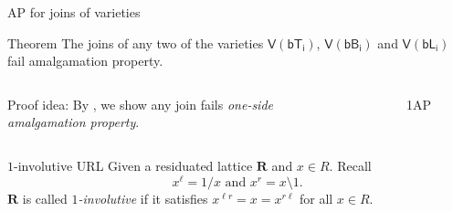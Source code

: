 \documentclass[professionalfont, handout, 12pt]{beamer} %
\theoremstyle{plain}
\theoremstyle{definition}
\newcommand{\m}[1]{{\mathbf {#1} }}
\newcommand{\ld}{{\setminus}}
\begin{document}
\begin{frame}{AP for joins of varieties}
    \begin{block}{Theorem}
    The joins of any two of the varieties $\mathsf{V(bT_i)}$, $\mathsf{V(bB_i)}$ and $\mathsf{V(bL_i)}$ fail amalgamation property.
    \end{block}
    \pause

\begin{columns}
    Proof idea: By \cite{fussner2022transfer}, we show any join fails \emph{one-side amalgamation property}.\pause

    \begin{figure}
        \centering
        \caption{1AP}
    \end{figure}
\end{columns}
    
\end{frame}

\begin{frame}{$1$-involutive URL}
    Given a residuated lattice $\m R$ and $x \in R$.
    Recall
    \[
        x^\ell = 1/x \text{ and } x^r = x \ld 1.
    \]
    $\m R$ is called \emph{$1$-involutive} if it satisfies $x^{\ell r} = x = x^{r \ell}$ for all $x \in R$.
    
\end{frame}
\end{document}
